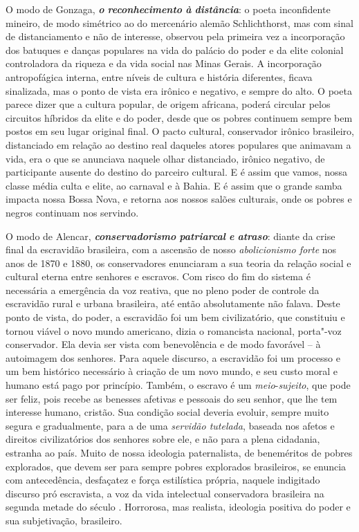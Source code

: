 O modo de Gonzaga, \emph{\textbf{o} \textbf{reconhecimento} \textbf{à}
\textbf{distância}}: o poeta inconfidente mineiro, de modo simétrico ao
do mercenário alemão Schlichthorst, mas com sinal de distanciamento e
não de interesse, observou pela primeira vez a incorporação dos batuques
e danças populares na vida do palácio do poder e da elite colonial
controladora da riqueza e da vida social nas Minas Gerais. A
incorporação antropofágica interna, entre níveis de cultura e história
diferentes, ficava sinalizada, mas o ponto de vista era irônico e
negativo, e sempre do alto. O poeta parece dizer que a cultura popular,
de origem africana, poderá circular pelos circuitos híbridos da elite e
do poder, desde que os pobres continuem sempre bem postos em seu lugar
original final. O pacto cultural, conservador irônico brasileiro,
distanciado em relação ao destino real daqueles atores populares que
animavam a vida, era o que se anunciava naquele olhar distanciado,
irônico negativo, de participante ausente do destino do parceiro
cultural. E é assim que vamos, nossa classe média culta e elite, ao
carnaval e à Bahia. E é assim que o grande samba impacta nossa Bossa
Nova, e retorna aos nossos salões culturais, onde os pobres e negros
continuam nos servindo.

O modo de Alencar, \emph{\textbf{conservadorismo} \textbf{patriarcal}
\textbf{e} \textbf{atraso}}: diante da crise final da escravidão
brasileira, com a ascensão de nosso \emph{abolicionismo forte} nos anos
de 1870 e 1880, os conservadores enunciaram a sua teoria da relação
social e cultural eterna entre senhores e escravos. Com risco do fim do
sistema é necessária a emergência da voz reativa, que no pleno poder de
controle da escravidão rural e urbana brasileira, até então
absolutamente não falava. Deste ponto de vista, do poder, a escravidão
foi um bem civilizatório, que constituiu e tornou viável o novo mundo
americano, dizia o romancista nacional, porta"-voz conservador. Ela devia
ser vista com benevolência e de modo favorável -- à autoimagem dos
senhores. Para aquele discurso, a escravidão foi um processo e um bem
histórico necessário à criação de um novo mundo, e seu custo moral e
humano está pago por princípio. Também, o escravo é um
\emph{meio}-\emph{sujeito}, que pode ser feliz, pois recebe as benesses
afetivas e pessoais do seu senhor, que lhe tem interesse humano,
cristão. Sua condição social deveria evoluir, sempre muito segura e
gradualmente, para a de uma \emph{servidão tutelada}, baseada nos afetos
e direitos civilizatórios dos senhores sobre ele, e não para a plena
cidadania, estranha ao país. Muito de nossa ideologia paternalista, de
beneméritos de pobres explorados, que devem ser para sempre pobres
explorados brasileiros, se enuncia com antecedência, desfaçatez e força
estilística própria, naquele indigitado discurso pró escravista, a voz
da vida intelectual conservadora brasileira na segunda metade do século
. Horrorosa, mas realista, ideologia positiva do poder e sua
subjetivação, brasileiro.


